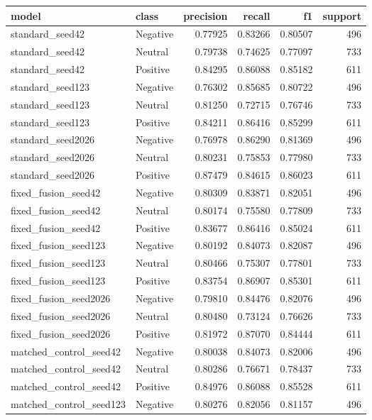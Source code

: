 \begin{tabular}{llrrrr}
\toprule
model & class & precision & recall & f1 & support \\
\midrule
standard\_seed42 & Negative & 0.77925 & 0.83266 & 0.80507 & 496 \\
standard\_seed42 & Neutral & 0.79738 & 0.74625 & 0.77097 & 733 \\
standard\_seed42 & Positive & 0.84295 & 0.86088 & 0.85182 & 611 \\
standard\_seed123 & Negative & 0.76302 & 0.85685 & 0.80722 & 496 \\
standard\_seed123 & Neutral & 0.81250 & 0.72715 & 0.76746 & 733 \\
standard\_seed123 & Positive & 0.84211 & 0.86416 & 0.85299 & 611 \\
standard\_seed2026 & Negative & 0.76978 & 0.86290 & 0.81369 & 496 \\
standard\_seed2026 & Neutral & 0.80231 & 0.75853 & 0.77980 & 733 \\
standard\_seed2026 & Positive & 0.87479 & 0.84615 & 0.86023 & 611 \\
fixed\_fusion\_seed42 & Negative & 0.80309 & 0.83871 & 0.82051 & 496 \\
fixed\_fusion\_seed42 & Neutral & 0.80174 & 0.75580 & 0.77809 & 733 \\
fixed\_fusion\_seed42 & Positive & 0.83677 & 0.86416 & 0.85024 & 611 \\
fixed\_fusion\_seed123 & Negative & 0.80192 & 0.84073 & 0.82087 & 496 \\
fixed\_fusion\_seed123 & Neutral & 0.80466 & 0.75307 & 0.77801 & 733 \\
fixed\_fusion\_seed123 & Positive & 0.83754 & 0.86907 & 0.85301 & 611 \\
fixed\_fusion\_seed2026 & Negative & 0.79810 & 0.84476 & 0.82076 & 496 \\
fixed\_fusion\_seed2026 & Neutral & 0.80480 & 0.73124 & 0.76626 & 733 \\
fixed\_fusion\_seed2026 & Positive & 0.81972 & 0.87070 & 0.84444 & 611 \\
matched\_control\_seed42 & Negative & 0.80038 & 0.84073 & 0.82006 & 496 \\
matched\_control\_seed42 & Neutral & 0.80286 & 0.76671 & 0.78437 & 733 \\
matched\_control\_seed42 & Positive & 0.84976 & 0.86088 & 0.85528 & 611 \\
matched\_control\_seed123 & Negative & 0.80276 & 0.82056 & 0.81157 & 496 \\

\end{tabular}
